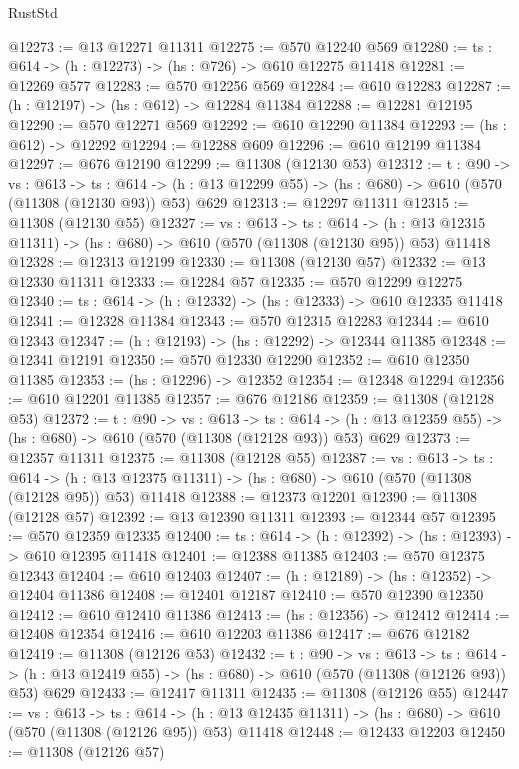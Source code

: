 \begin{lexlean}{RustStd}
\begin{coremodule}
@12273 := @13 @12271 @11311
@12275 := @570 @12240 @569
@12280 := {ts : @614} -> (h : @12273) -> (hs : @726) -> @610 @12275 @11418
@12281 := @12269 @577
@12283 := @570 @12256 @569
@12284 := @610 @12283
@12287 := (h : @12197) -> (hs : @612) -> @12284 @11384
@12288 := @12281 @12195
@12290 := @570 @12271 @569
@12292 := @610 @12290 @11384
@12293 := (hs : @612) -> @12292
@12294 := @12288 @609
@12296 := @610 @12199 @11384
@12297 := @676 @12190
@12299 := @11308 (@12130 @53)
@12312 := {t : @90} ->
  {vs : @613} ->
  {ts : @614} -> (h : @13 @12299 @55) -> (hs : @680) -> @610 (@570 (@11308 (@12130 @93)) @53) @629
@12313 := @12297 @11311
@12315 := @11308 (@12130 @55)
@12327 := {vs : @613} ->
  {ts : @614} ->
  (h : @13 @12315 @11311) -> (hs : @680) -> @610 (@570 (@11308 (@12130 @95)) @53) @11418
@12328 := @12313 @12199
@12330 := @11308 (@12130 @57)
@12332 := @13 @12330 @11311
@12333 := @12284 @57
@12335 := @570 @12299 @12275
@12340 := {ts : @614} -> (h : @12332) -> (hs : @12333) -> @610 @12335 @11418
@12341 := @12328 @11384
@12343 := @570 @12315 @12283
@12344 := @610 @12343
@12347 := (h : @12193) -> (hs : @12292) -> @12344 @11385
@12348 := @12341 @12191
@12350 := @570 @12330 @12290
@12352 := @610 @12350 @11385
@12353 := (hs : @12296) -> @12352
@12354 := @12348 @12294
@12356 := @610 @12201 @11385
@12357 := @676 @12186
@12359 := @11308 (@12128 @53)
@12372 := {t : @90} ->
  {vs : @613} ->
  {ts : @614} -> (h : @13 @12359 @55) -> (hs : @680) -> @610 (@570 (@11308 (@12128 @93)) @53) @629
@12373 := @12357 @11311
@12375 := @11308 (@12128 @55)
@12387 := {vs : @613} ->
  {ts : @614} ->
  (h : @13 @12375 @11311) -> (hs : @680) -> @610 (@570 (@11308 (@12128 @95)) @53) @11418
@12388 := @12373 @12201
@12390 := @11308 (@12128 @57)
@12392 := @13 @12390 @11311
@12393 := @12344 @57
@12395 := @570 @12359 @12335
@12400 := {ts : @614} -> (h : @12392) -> (hs : @12393) -> @610 @12395 @11418
@12401 := @12388 @11385
@12403 := @570 @12375 @12343
@12404 := @610 @12403
@12407 := (h : @12189) -> (hs : @12352) -> @12404 @11386
@12408 := @12401 @12187
@12410 := @570 @12390 @12350
@12412 := @610 @12410 @11386
@12413 := (hs : @12356) -> @12412
@12414 := @12408 @12354
@12416 := @610 @12203 @11386
@12417 := @676 @12182
@12419 := @11308 (@12126 @53)
@12432 := {t : @90} ->
  {vs : @613} ->
  {ts : @614} -> (h : @13 @12419 @55) -> (hs : @680) -> @610 (@570 (@11308 (@12126 @93)) @53) @629
@12433 := @12417 @11311
@12435 := @11308 (@12126 @55)
@12447 := {vs : @613} ->
  {ts : @614} ->
  (h : @13 @12435 @11311) -> (hs : @680) -> @610 (@570 (@11308 (@12126 @95)) @53) @11418
@12448 := @12433 @12203
@12450 := @11308 (@12126 @57)

\end{coremodule}
\end{lexlean}
